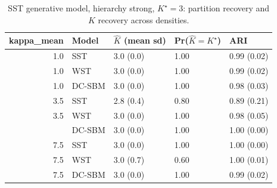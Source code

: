 \begin{table}
\centering
\caption{SST generative model, hierarchy strong, $K^\star=3$: partition recovery and $K$ recovery across densities.}
\centering
\begin{tabular}[t]{rllll}
\toprule
kappa_mean & Model & $\hat K$ (mean sd) & Pr($\hat K = K^\star$) & ARI\\
\midrule
1.0 & SST & 3.0 (0.0) & 1.00 & 0.99 (0.02)\\
1.0 & WST & 3.0 (0.0) & 1.00 & 0.99 (0.02)\\
1.0 & DC-SBM & 3.0 (0.0) & 1.00 & 0.98 (0.03)\\
3.5 & SST & 2.8 (0.4) & 0.80 & 0.89 (0.21)\\
3.5 & WST & 3.0 (0.0) & 1.00 & 0.98 (0.05)\\
\addlinespace
3.5 & DC-SBM & 3.0 (0.0) & 1.00 & 1.00 (0.00)\\
7.5 & SST & 3.0 (0.0) & 1.00 & 1.00 (0.00)\\
7.5 & WST & 3.0 (0.7) & 0.60 & 1.00 (0.01)\\
7.5 & DC-SBM & 3.0 (0.0) & 1.00 & 0.99 (0.02)\\
\bottomrule
\end{tabular}
\end{table}
